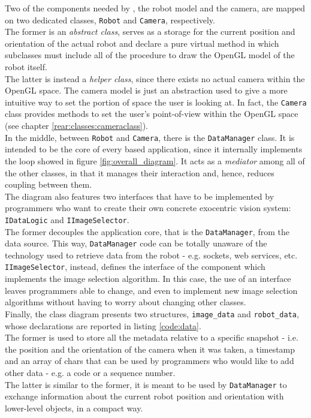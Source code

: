 Two of the components needed by \framework{}, the robot 
model and the camera, are mapped on two dedicated classes, 
\texttt{Robot} and \texttt{Camera}, respectively.
\\
The former is an \textit{abstract class}, serves as a storage 
for the current position and orientation of the actual
robot and declare a pure virtual method in which subclasses 
must include all of the procedure to draw the OpenGL model 
of the robot itself.
\\
The latter is instead a \textit{helper class}, since there 
exists no actual camera within the OpenGL space. The camera 
model is just an abstraction used to give a more intuitive
way to set the portion of space the user is looking at.
In fact, the \texttt{Camera} class provides methods to 
set the user's point-of-view within the OpenGL space (see
chapter \ref{rear:classes:cameraclass}).
\\
In the middle, between \texttt{Robot} and \texttt{Camera},
there is the \texttt{DataManager} class. It is intended to be 
the core of every \framework{} based application, since it 
internally implements the loop showed in figure 
\ref{fig:overall_diagram}.
It acts as a \textit{mediator} among all of the other classes, 
in that it manages their interaction and, hence, reduces 
coupling between them.
\\
The diagram also features two interfaces that have to be implemented 
by programmers who want to create their own concrete exocentric 
vision system: \texttt{IDataLogic} and 
\texttt{IImageSelector}.
\\
The former decouples the application 
core, that is the \texttt{DataManager}, from the data source.
This way, \texttt{DataManager} code can be totally unaware of 
the technology used to retrieve data from the robot - e.g. 
sockets, web services, etc.
\\
\texttt{IImageSelector}, instead, defines the interface 
of the component which implements the image selection algorithm.
In this case, the use of an interface leaves programmers 
able to change, and even to implement new image 
selection algorithms without having to worry about
changing other classes.
\\
Finally, the class diagram presents two structures, 
\texttt{image\_data} and \texttt{robot\_data}, whose 
declarations are reported in listing \ref{code:data}.
\\
The former is used to store all the metadata 
relative to a specific snapshot - i.e. the position 
and the orientation of the camera when it was taken, 
a timestamp and an array of chars that can be used by 
programmers who would like to add other data - e.g. 
a code or a sequence number.
\\
The latter is similar to the former, it is meant to be 
used by \texttt{DataManager} to exchange information
about the current robot position and orientation with 
lower-level objects, in a compact way.


